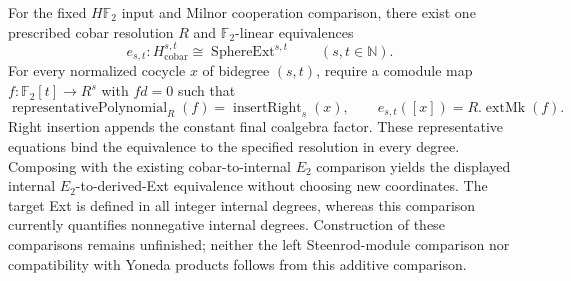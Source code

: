 \begin{theorem}
  \label{thm:cobar-derived-comodule-ext-comparison}
  \notready
  For the fixed $H\mathbb F_2$ input and Milnor cooperation comparison,
  there exist one prescribed cobar resolution $R$ and $\mathbb F_2$-linear
  equivalences
  \[
    e_{s,t}:H^{s,t}_{\mathrm{cobar}}\cong
       \operatorname{SphereExt}^{s,t}\qquad(s,t\in\mathbb N).
  \]
  For every normalized cocycle $x$ of bidegree $(s,t)$, require a comodule
  map $f:\mathbb F_2[t]\to R^s$ with $fd=0$ such that
  \[
    \operatorname{representativePolynomial}_R(f)
       =\operatorname{insertRight}_s(x),\qquad
    e_{s,t}([x])=R.\operatorname{extMk}(f).
  \]
  Right insertion appends the constant final coalgebra factor. These
  representative equations bind the equivalence to the specified
  resolution in every degree. Composing with the existing cobar-to-internal
  $E_2$ comparison yields the displayed internal $E_2$-to-derived-Ext
  equivalence without choosing new coordinates.
  The target Ext is defined in all integer internal degrees, whereas this
  comparison currently quantifies nonnegative internal degrees.
  Construction of these comparisons remains unfinished; neither the
  left Steenrod-module comparison nor compatibility with Yoneda products
  follows from this additive comparison.
\end{theorem}

